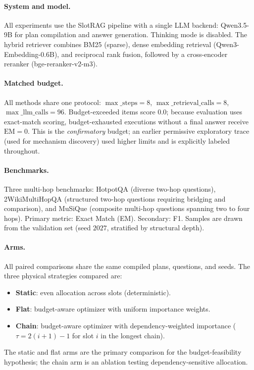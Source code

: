 \paragraph{System and model.}
All experiments use the SlotRAG pipeline with a single LLM backend: Qwen3.5-9B for plan compilation and answer generation. Thinking mode is disabled. The hybrid retriever combines BM25 (sparse), dense embedding retrieval (Qwen3-Embedding-0.6B), and reciprocal rank fusion, followed by a cross-encoder reranker (bge-reranker-v2-m3).

\paragraph{Matched budget.}
All methods share one protocol: $\max\_\mathrm{steps}=8$, $\max\_\mathrm{retrieval\_calls}=8$, $\max\_\mathrm{llm\_calls}=96$. Budget-exceeded items score $0.0$; because evaluation uses exact-match scoring, budget-exhausted executions without a final answer receive $\text{EM} = 0$. This is the \emph{confirmatory} budget; an earlier permissive exploratory trace (used for mechanism discovery) used higher limits and is explicitly labeled throughout.

\paragraph{Benchmarks.}
Three multi-hop benchmarks: HotpotQA \cite{hotpotqa} (diverse two-hop questions), 2WikiMultiHopQA \cite{2wikimultihop} (structured two-hop questions requiring bridging and comparison), and MuSiQue \cite{musique} (composite multi-hop questions spanning two to four hops). Primary metric: Exact Match (EM). Secondary: F1. Samples are drawn from the validation set (seed $2027$, stratified by structural depth).

\paragraph{Arms.}
All paired comparisons share the same compiled plans, questions, and seeds. The three physical strategies compared are:
\begin{itemize}
\item \textbf{Static}: even allocation across slots (deterministic).
\item \textbf{Flat}: budget-aware optimizer with uniform importance weights.
\item \textbf{Chain}: budget-aware optimizer with dependency-weighted importance ($\tau = 2(i+1) - 1$ for slot $i$ in the longest chain).
\end{itemize}
The static and flat arms are the primary comparison for the budget-feasibility hypothesis; the chain arm is an ablation testing dependency-sensitive allocation.

